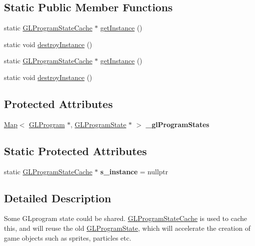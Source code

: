 \subsection*{Static Public Member Functions}
\begin{DoxyCompactItemize}
\item 
static \hyperlink{classGLProgramStateCache}{G\+L\+Program\+State\+Cache} $\ast$ \hyperlink{classGLProgramStateCache_a5a3341fe25a92f64f28e04f4f17ae5d5}{get\+Instance} ()
\item 
static void \hyperlink{classGLProgramStateCache_af0457c8748b9b7578c8cf6ab89525a11}{destroy\+Instance} ()
\item 
static \hyperlink{classGLProgramStateCache}{G\+L\+Program\+State\+Cache} $\ast$ \hyperlink{classGLProgramStateCache_a7f5ed5b5ed70843282b063950aabf8ca}{get\+Instance} ()
\item 
static void \hyperlink{classGLProgramStateCache_a216ffb30e515be9bda80619fc5830505}{destroy\+Instance} ()
\end{DoxyCompactItemize}
\subsection*{Protected Attributes}
\begin{DoxyCompactItemize}
\item 
\mbox{\label{classGLProgramStateCache_a37d78fa866700a5c349a16709d35764c}} 
\hyperlink{classMap}{Map}$<$ \hyperlink{classGLProgram}{G\+L\+Program} $\ast$, \hyperlink{classGLProgramState}{G\+L\+Program\+State} $\ast$ $>$ {\bfseries \+\_\+gl\+Program\+States}
\end{DoxyCompactItemize}
\subsection*{Static Protected Attributes}
\begin{DoxyCompactItemize}
\item 
\mbox{\label{classGLProgramStateCache_a019c8c487da9b4da0ff7f66baf2f9620}} 
static \hyperlink{classGLProgramStateCache}{G\+L\+Program\+State\+Cache} $\ast$ {\bfseries s\+\_\+instance} = nullptr
\end{DoxyCompactItemize}


\subsection{Detailed Description}
Some G\+Lprogram state could be shared. \hyperlink{classGLProgramStateCache}{G\+L\+Program\+State\+Cache} is used to cache this, and will reuse the old \hyperlink{classGLProgramState}{G\+L\+Program\+State}, which will accelerate the creation of game objects such as sprites, particles etc. 

